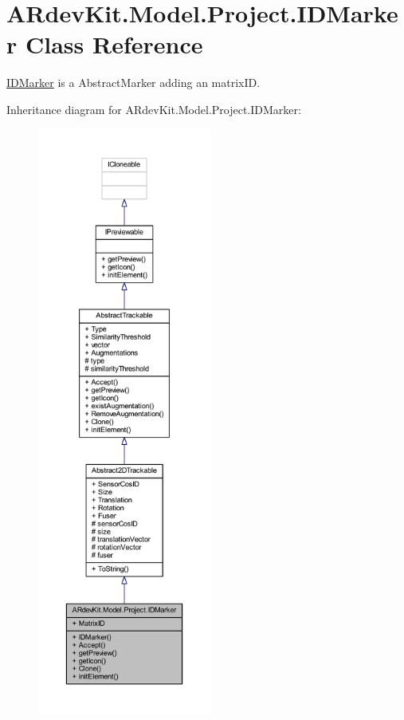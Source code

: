 \hypertarget{class_a_rdev_kit_1_1_model_1_1_project_1_1_i_d_marker}{\section{A\-Rdev\-Kit.\-Model.\-Project.\-I\-D\-Marker Class Reference}
\label{class_a_rdev_kit_1_1_model_1_1_project_1_1_i_d_marker}
}


\hyperlink{class_a_rdev_kit_1_1_model_1_1_project_1_1_i_d_marker}{I\-D\-Marker} is a Abstract\-Marker adding an matrix\-I\-D.  




Inheritance diagram for A\-Rdev\-Kit.\-Model.\-Project.\-I\-D\-Marker\-:
\nopagebreak
\begin{figure}[H]
\begin{center}
\leavevmode
\includegraphics[height=550pt]{class_a_rdev_kit_1_1_model_1_1_project_1_1_i_d_marker__inherit__graph}
\end{center}
\end{figure}


